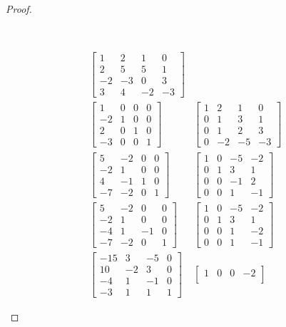 \documentclass[11pt]{article}
\newenvironment{myproof}
{\begin{proof} \begin{adjustwidth}{3em}{0pt}$ $\par\nobreak\ignorespaces}
{\end{adjustwidth} \end{proof}}
\begin{document}
\begin{flushleft}
\begin{myproof}
\begin{align*}
\begin{bmatrix}
1 & 2 & 1 & 0 \\
2 & 5 & 5 & 1 \\
-2 & -3 & 0 & 3 \\
3 & 4 & -2 & -3
\end{bmatrix} \\
\begin{bmatrix}
1 & 0 & 0 & 0 \\
-2 & 1 & 0 & 0 \\
2 & 0 & 1 & 0 \\
-3 & 0 & 0 & 1
\end{bmatrix}
&\begin{bmatrix}
1 & 2 & 1 & 0 \\
0 & 1 & 3 & 1 \\
0 & 1 & 2 & 3 \\
0 & -2 & -5 & -3
\end{bmatrix} \\
\begin{bmatrix}
5 & -2 & 0 & 0 \\
-2 & 1 & 0 & 0 \\
4 & -1 & 1 & 0 \\
-7 & -2 & 0 & 1
\end{bmatrix}
&\begin{bmatrix}
1 & 0 & -5 & -2 \\
0 & 1 & 3 & 1 \\
0 & 0 & -1 & 2 \\
0 & 0 & 1 & -1
\end{bmatrix} \\
\begin{bmatrix}
5 & -2 & 0 & 0 \\
-2 & 1 & 0 & 0 \\
-4 & 1 & -1 & 0 \\
-7 & -2 & 0 & 1
\end{bmatrix}
&\begin{bmatrix}
1 & 0 & -5 & -2 \\
0 & 1 & 3 & 1 \\
0 & 0 & 1 & -2 \\
0 & 0 & 1 & -1
\end{bmatrix} \\
\begin{bmatrix}
-15 & 3 & -5 & 0 \\
10 & -2 & 3 & 0 \\
-4 & 1 & -1 & 0 \\
-3 & 1 & 1 & 1
\end{bmatrix}
&\begin{bmatrix}
1 & 0 & 0 & -2 \\

\end{bmatrix}
\end{align*}
\end{myproof}
\end{flushleft}
\end{document}
